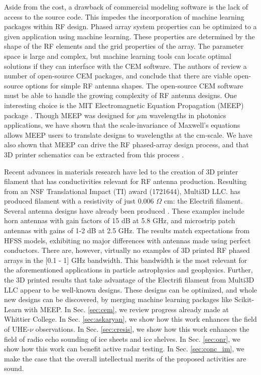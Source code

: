 \documentclass[../../main.tex]{subfiles}
\begin{document}
Aside from the cost, a drawback of commercial modeling software is the lack of access to the source code.  This impedes the incorporation of machine learning packages within RF design.  Phased array system properties can be optimized to a given application using machine learning.  These properties are determined by the shape of the RF elements and the grid properties of the array.  The parameter space is large and complex, but machine learning tools can locate optimal solutions if they can interface with the CEM software.  The authors of \cite{10.3390/electronics8121506} review a number of open-source CEM packages, and conclude that there are viable open-source options for simple RF antenna shapes.  The open-source CEM software must be able to handle the growing complexity of RF antenna designs.  One interesting choice is the MIT Electromagnetic Equation Propagation (MEEP) package \cite{10.1016/j.cpc.2009.11.008}.  Though MEEP was designed for $\mu$m wavelengths in photonics applications, we have shown that the scale-invariance of Maxwell's equations allows MEEP users to translate designs to wavelengths at the cm-scale.  We have also shown that MEEP can drive the RF phased-array design process, and that 3D printer schematics can be extracted from this process \cite{electronics10040415,meepcon2022,10.1016/j.cpc.2009.11.008}. \\ \vspace{2.5mm}

Recent advances in materials research have led to the creation of 3D printer filament that has conductivities relevant for RF antenna production.  Resulting from an NSF Translational Impact (TI) award (1721644), Multi3D LLC. has produced filament with a resistivity of just 0.006 $\Omega$ cm: the Electrifi filament.  Several antenna designs have already been produced \cite{8786183,10.1049/iet-map.2017.0104}.  These examples include horn antennas with gain factors of 15 dB at 5.8 GHz, and microstrip patch antennas with gains of 1-2 dB at 2.5 GHz.  The results match expectations from HFSS models, exhibiting no major differences with antennas made using perfect conductors.  There are, however, virtually no examples of 3D printed RF phased arrays in the [0.1 - 1] GHz bandwidth.  This bandwidth is the most relevant for the aforementioned applications in particle astrophysics and geophysics.  Further, the 3D printed results that take advantage of the Electrifi filament from Multi3D LLC appear to be well-known designs.  These designs can be optimized, and whole new designs can be discovered, by merging machine learning packages like Scikit-Learn with MEEP.  In Sec. \ref{sec:cem}, we review progress already made at Whittier College.  In Sec. \ref{sec:askaryan}, we show how this work enhances the field of UHE-$\nu$ observations.  In Sec. \ref{sec:cresis}, we show how this work enhances the field of radio echo sounding of ice sheets and ice shelves.  In Sec. \ref{sec:onr}, we show how this work can benefit active radar testing.  In Sec. \ref{sec:conc_im}, we make the case that the overall intellectual merits of the proposed activities are sound.
\end{document}
